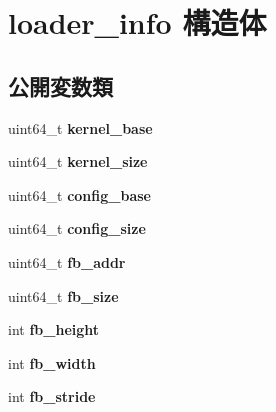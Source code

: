 \hypertarget{structloader__info}{}\section{loader\+\_\+info 構造体}
\label{structloader__info}
\subsection*{公開変数類}
\begin{DoxyCompactItemize}
\item 
\hypertarget{structloader__info_aa148e3c904ba43281cdd45e01d793347}{}\label{structloader__info_aa148e3c904ba43281cdd45e01d793347} 
uint64\+\_\+t {\bfseries kernel\+\_\+base}
\item 
\hypertarget{structloader__info_ab2674c143481654517776580d8223781}{}\label{structloader__info_ab2674c143481654517776580d8223781} 
uint64\+\_\+t {\bfseries kernel\+\_\+size}
\item 
\hypertarget{structloader__info_a415726bcdc3a139a80bbaa4fc6326764}{}\label{structloader__info_a415726bcdc3a139a80bbaa4fc6326764} 
uint64\+\_\+t {\bfseries config\+\_\+base}
\item 
\hypertarget{structloader__info_ac5e2a4ab750df4b2b2e17080faac4a01}{}\label{structloader__info_ac5e2a4ab750df4b2b2e17080faac4a01} 
uint64\+\_\+t {\bfseries config\+\_\+size}
\item 
\hypertarget{structloader__info_a112e32ed8b29e2e0b3a05f83808c900b}{}\label{structloader__info_a112e32ed8b29e2e0b3a05f83808c900b} 
uint64\+\_\+t {\bfseries fb\+\_\+addr}
\item 
\hypertarget{structloader__info_ad96aaa3361d34e57ee71e55f99f6aafa}{}\label{structloader__info_ad96aaa3361d34e57ee71e55f99f6aafa} 
uint64\+\_\+t {\bfseries fb\+\_\+size}
\item 
\hypertarget{structloader__info_af1a4f5d69d31b73059a3f8f7c941cd9d}{}\label{structloader__info_af1a4f5d69d31b73059a3f8f7c941cd9d} 
int {\bfseries fb\+\_\+height}
\item 
\hypertarget{structloader__info_ae1e36e8e327d9e32107b8cb1979e2052}{}\label{structloader__info_ae1e36e8e327d9e32107b8cb1979e2052} 
int {\bfseries fb\+\_\+width}
\item 
\hypertarget{structloader__info_ac5f9ac4ea2a4eedcd4d80ebeb533e626}{}\label{structloader__info_ac5f9ac4ea2a4eedcd4d80ebeb533e626} 
int {\bfseries fb\+\_\+stride}
\item 
\hypertarget{structloader__info_a699b65d775c00897a31927c193e038bc}{}\label{structloader__info_a699b65d775c00897a31927c193e038bc} 

\end{DoxyCompactItemize}
